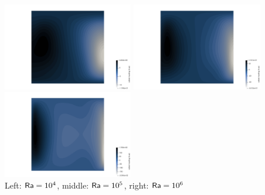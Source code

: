 \begin{center}
\includegraphics[width=5.7cm]{python_codes/fieldstone_110/results_EBA/adiab_1e4}
\includegraphics[width=5.7cm]{python_codes/fieldstone_110/results_EBA/adiab_1e5}
\includegraphics[width=5.7cm]{python_codes/fieldstone_110/results_EBA/adiab_1e6}\\
{\captionfont Left: ${\mathsf{Ra}}=10^4$, middle: ${\mathsf{Ra}}=10^5$, right: ${\mathsf{Ra}}=10^6$} 
\end{center}
